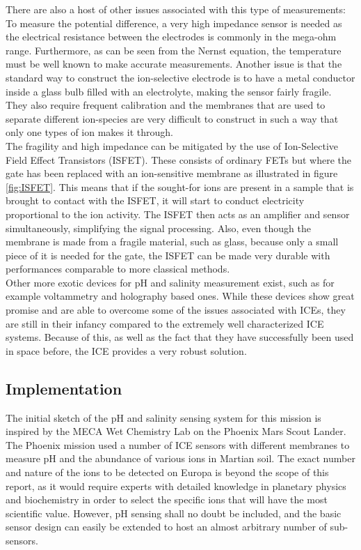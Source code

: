 \noindent
There are also a host of other issues associated with this type of measurements: To measure the potential difference, a very high impedance sensor is needed as the electrical resistance between the electrodes is commonly in the mega-ohm range\cite{website:ph3}. Furthermore, as can be seen from the Nernst equation, the temperature must be well known to make accurate measurements. Another issue is that the standard way to construct the ion-selective electrode is to have a metal conductor inside a glass bulb filled with an electrolyte, making the sensor fairly fragile. They also require frequent calibration and the membranes that are used to separate different ion-species are very difficult to construct in such a way that only one types of ion makes it through\cite{website:ph1}.\\

\noindent
The fragility and high impedance can be mitigated by the use of Ion-Selective Field Effect Transistors (ISFET). These consists of ordinary FETs but where the gate has been replaced with an ion-sensitive membrane as illustrated in figure \ref{fig:ISFET}. This means that if the sought-for ions are present in a sample that is brought to contact with the ISFET, it will start to conduct electricity proportional to the ion activity. The ISFET then acts as an amplifier and sensor simultaneously, simplifying the signal processing\cite{website:ph4}. Also, even though the membrane is made from a fragile material, such as glass, because only a small piece of it is needed for the gate, the ISFET can be made very durable with performances comparable to more classical methods\cite{website:ph4}. \\ 

\noindent
Other more exotic devices for pH and salinity measurement exist, such as for example voltammetry\cite{website:senova} and holography\cite{article:marshall2003a} based ones. While these devices show great promise and are able to overcome some of the issues associated with ICEs, they are still in their infancy compared to the extremely well characterized ICE systems. Because of this, as well as the fact that they have successfully been used in space before\cite{article:jgre2487}, the ICE provides a very robust solution.

\subsection{Implementation}
The initial sketch of the pH and salinity sensing system for this mission is inspired by the MECA Wet Chemistry Lab on the Phoenix Mars Scout Lander. The Phoenix mission used a number of ICE sensors with different membranes to measure pH and the abundance of various ions in Martian soil\cite{article:jgre2487}. The exact number and nature of the ions to be detected on Europa is beyond the scope of this report, as it would require experts with detailed knowledge in planetary physics and biochemistry in order to select the specific ions that will have the most scientific value. However, pH sensing shall no doubt be included, and the basic sensor design can easily be extended to host an almost arbitrary number of sub-sensors.\\


